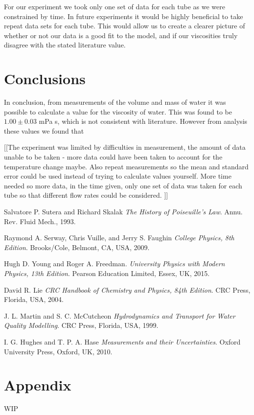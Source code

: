 \documentclass[twocolumn]{revtex4}
\newcommand{\squeezeup}{\vspace{-2.5mm}}
\begin{document}
For our experiment we took only one set of data for each tube as we were constrained by time. In future experiments it would be highly beneficial to take repeat data sets for each tube. This would allow us to create a clearer picture of whether or not our data is a good fit to the model, and if our viscosities truly disagree with the stated literature value. 

\vspace{-5ex}
\section{Conclusions}
\vspace{-2ex}
 
In conclusion, from measurements of the volume and mass of water it was possible to calculate a value for the viscosity of water. This was found to be $1.00 \pm 0.03$ mPa s, which is not consistent with literature. However from analysis these values we found that 


 [[The experiment was limited by difficulties in measurement, the amount of data unable to be taken - more data could have been taken to account for the temperature change maybe. Also repeat measurements so the mean and standard error could be used instead of trying to calculate values yourself. More time needed so more data, in the time given, only one set of data was taken for each tube so that different flow rates could be considered. ]]

\squeezeup
\squeezeup

\begin{thebibliography}{5}
	Salvatore P. Sutera and Richard Skalak
	\textit{The History of Poiseuille's Law}.
	Annu. Rev. Fluid Mech., 1993.
	
	Raymond A. Serway, Chris Vuille, and Jerry S. Faughin
	\textit{College Physics, 8th Edition}.
	Brooks/Cole, Belmont, CA, USA, 2009.

	Hugh D. Young and Roger A. Freedman.
	\textit{University Physics with Modern Physics, 13th Edition}. 
	Pearson Education Limited, Essex, UK, 2015.
	
	David R. Lie
	\textit{CRC Handbook of Chemistry and Physics, 84th Edition}. 
	CRC Press, Florida, USA, 2004.
	
	J. L. Martin and S. C. McCutcheon
	\textit{Hydrodynamics and Transport for Water Quality Modelling}. 
	CRC Press, Florida, USA, 1999.
	
	I. G. Hughes and T. P. A. Hase
	\textit{Measurements and their Uncertainties}. 
	Oxford University Press, Oxford, UK, 2010.
	
\end{thebibliography}
\clearpage

\vfill
\twocolumngrid
\vspace{-3ex}
\section*{Appendix}
\vspace{-2ex}

WIP

\clearpage
\end{document}
